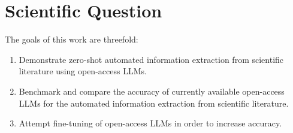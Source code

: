 








\section{Scientific Question}\label{sec:question}

The goals of this work are threefold:
\begin{enumerate}
    \item Demonstrate zero-shot automated information extraction from scientific literature using open-access \glspl{LLM}.
    \item Benchmark and compare the accuracy of currently available open-access \glspl{LLM} for the automated information extraction from scientific literature.
    \item Attempt fine-tuning of open-access \glspl{LLM} in order to increase accuracy.
\end{enumerate}

